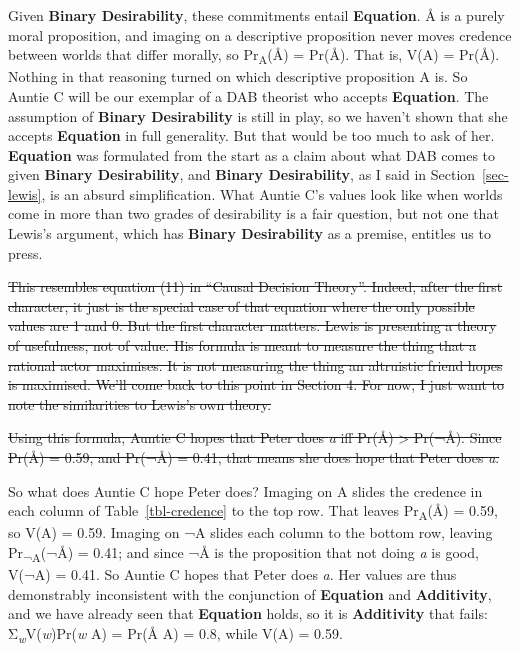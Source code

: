 \documentclass[
  11pt,
  letterpaper,
  DIV=11,
  numbers=noendperiod,
  twoside]{scrartcl}
\begin{document}
Given \textbf{Binary Desirability}, these commitments entail
\textbf{Equation}. Å is a purely moral proposition, and imaging on a
descriptive proposition never moves credence between worlds that differ
morally, so Pr\textsubscript{A}(Å) = Pr(Å). That is, V(A) = Pr(Å).
Nothing in that reasoning turned on which descriptive proposition A is.
So Auntie C will be our exemplar of a DAB theorist who accepts
\textbf{Equation}. The assumption of \textbf{Binary Desirability} is
still in play, so we haven't shown that she accepts \textbf{Equation} in
full generality. But that would be too much to ask of her.
\textbf{Equation} was formulated from the start as a claim about what
DAB comes to given \textbf{Binary Desirability}, and \textbf{Binary
Desirability}, as I said in Section~\ref{sec-lewis}, is an absurd
simplification. What Auntie C's values look like when worlds come in
more than two grades of desirability is a fair question, but not one
that Lewis's argument, which has \textbf{Binary Desirability} as a
premise, entitles us to press.

\endgroup

\sout{This resembles equation (11) in ``Causal Decision Theory''.
Indeed, after the first character, it just is the special case of that
equation where the only possible values are 1 and 0. But the first
character matters. Lewis is presenting a theory of usefulness, not of
value. His formula is meant to measure the thing that a rational actor
maximises. It is not measuring the thing an altruistic friend hopes is
maximised. We'll come back to this point in Section 4. For now, I just
want to note the similarities to Lewis's own theory.}

\sout{Using this formula, Auntie C hopes that Peter does \emph{a} iff
Pr(Å) \textgreater{} Pr(¬Å). Since Pr(Å) = 0.59, and Pr(¬Å) = 0.41, that
means she does hope that Peter does \emph{a}.}

\begingroup\bfseries\boldmath

So what does Auntie C hope Peter does? Imaging on A slides the credence
in each column of Table~\ref{tbl-credence} to the top row. That leaves
Pr\textsubscript{A}(Å) = 0.59, so V(A) = 0.59. Imaging on ¬A slides each
column to the bottom row, leaving Pr\textsubscript{¬A}(¬Å) = 0.41; and
since ¬Å is the proposition that not doing \emph{a} is good, V(¬A) =
0.41. So Auntie C hopes that Peter does \emph{a}. Her values are thus
demonstrably inconsistent with the conjunction of \textbf{Equation} and
\textbf{Additivity}, and we have already seen that \textbf{Equation}
holds, so it is \textbf{Additivity} that fails:
Σ\textsubscript{\emph{w}}V(\emph{w})Pr(\emph{w} \textbar{} A) = Pr(Å
\textbar{} A) = 0.8, while V(A) = 0.59.
\end{document}
